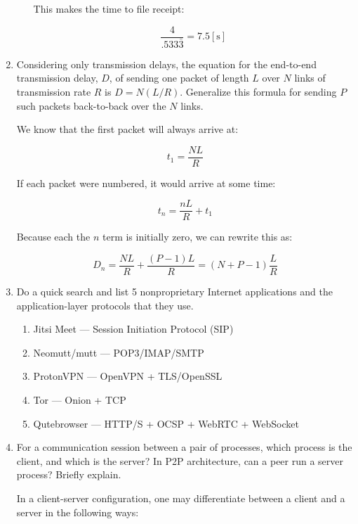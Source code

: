 \begin{enumerate}
\begin{enumerate}
        This makes the time to file receipt:

        $$\frac{4}{.533\bar{3}}=7.5[\si{\second}]$$

    \end{enumerate}
    
  \item Considering only transmission delays, the equation for the end-to-end transmission delay, $D$, of sending one packet of length $L$ over $N$ links of transmission rate $R$ is $D=N(L/R)$. Generalize this formula for sending $P$ such packets back-to-back over the $N$ links.

    We know that the first packet will always arrive at:

    $$t_1=\frac{NL}{R}$$

    If each packet were numbered, it would arrive at some time:

    $$t_n=\frac{nL}{R}+t_1$$

    Because each the $n$ term is initially zero, we can rewrite this as:

    $$D_n=\frac{NL}{R}+\frac{(P-1)L}{R}=(N+P-1)\frac{L}{R}$$
    
  \item Do a quick search and list 5 nonproprietary Internet applications and the application-layer protocols that they use.

    \begin{enumerate}

      \item Jitsi Meet — Session Initiation Protocol (SIP)

      \item Neomutt/mutt — POP3/IMAP/SMTP

      \item ProtonVPN — OpenVPN + TLS/OpenSSL

      \item Tor — Onion + TCP

      \item Qutebrowser — HTTP/S + OCSP + WebRTC + WebSocket

    \end{enumerate}
    
  \item For a communication session between a pair of processes, which process is the client, and which is the server? In P2P architecture, can a peer run a server process? Briefly explain.

    In a client-server configuration, one may differentiate between a client and a server in the following ways:


\end{enumerate}

